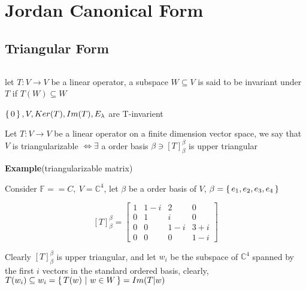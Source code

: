 


\cfoot{\thepage} %



\section{Jordan Canonical Form}

\subsection{Triangular Form}$ $


\begin{defn}
	let $T:V \rightarrow V$ be a linear operator, a subspace $W \subseteq V$ is said to be invariant under $T$ if $T(W) \subseteq W$
\end{defn}

\begin{tcolorbox}
	\begin{rmk*}
		$\left\{ \,0 \,\right\},V,Ker(T),Im(T),E_{\lambda}$ are T-invarient
	\end{rmk*}
\end{tcolorbox}

\begin{defn}
	Let $T:V \rightarrow V$ be a linear operator on a finite dimension vector space, we say that $V$ is triangularizable $\Leftrightarrow \exists$ a order basis $\beta \ni [T]^{\beta}_{\beta}$ is upper triangular  
\end{defn}

\textbf{Example}(triangularizable matrix)

\begin{tcolorbox}
	Consider $\mathbb F = \mathbb = C,~V = \mathbb C^4$, let $\beta$ be a order basis of $V$, $\beta = \left\{ \,e_1,e_2,e_3,e_4 \,\right\}$
	
	$$[T]^{\beta}_{\beta} = \left[ \begin{matrix}
		1&1-i&2&0\\
		0&1&i&0\\
		0&0&1-i&3+i\\
		0&0&0&1-i
	\end{matrix}\right]$$
	
	Clearly $[T]^{\beta}_{\beta}$ is upper triangular, and let $w_i$ be the subspace of $\mathbb C^4$ spanned by the first $i$ vectors in the standard ordered basis, clearly, $T(w_i) \subseteq w_i = \left\{ \,T(w)~|~w\in W \,\right\} = Im(T|w)$
\end{tcolorbox}

